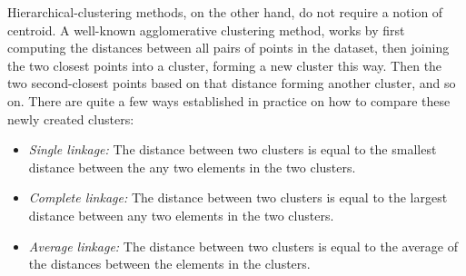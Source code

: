 \documentclass[parskip]{cs4rep}
\begin{document}
Hierarchical-clustering methods, on the other hand, do not require a notion of centroid. A well-known agglomerative clustering method, works by first computing the distances between all pairs of points in the dataset, then joining the two closest points into a cluster, forming a new cluster this way. Then the two second-closest points based on that distance forming another cluster, and so on. There are quite a few ways established in practice on how to compare these newly created clusters:

\begin{itemize}
   \item \emph{Single linkage:} The distance between two clusters is equal to the smallest distance between the any two elements in the two clusters.
   \item \emph{Complete linkage:} The distance between two clusters is equal to the largest distance between any two elements in the two clusters.
   \item \emph{Average linkage:} The distance between two clusters is equal to the average of the distances between the elements in the clusters.
\end{itemize}
\end{document}
